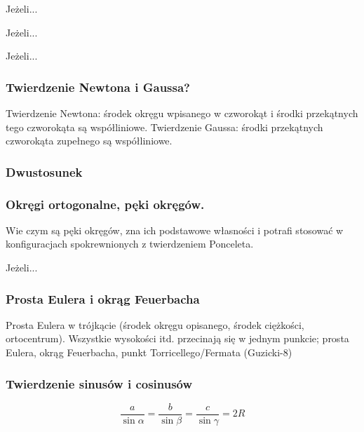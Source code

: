 \begin{proposition}
	Jeżeli...
\end{proposition}
\begin{theorem}
	Jeżeli...
\end{theorem}
\begin{definition}
	Jeżeli...
\end{definition}


\subsubsection{Twierdzenie Newtona i Gaussa?}
Twierdzenie Newtona: środek okręgu wpisanego w czworokąt i środki przekątnych tego czworokąta są współliniowe.
Twierdzenie Gaussa: środki przekątnych czworokąta zupełnego są współliniowe.

\subsubsection{Dwustosunek}

\subsubsection{Okręgi ortogonalne, pęki okręgów.}
Wie czym są pęki okręgów, zna ich podstawowe własności i potrafi stosować w konfiguracjach spokrewnionych z twierdzeniem Ponceleta.   

\begin{theorem}[Ponceleta]
	Jeżeli...
\end{theorem}


\subsubsection{Prosta Eulera i okrąg Feuerbacha}
Prosta Eulera w trójkącie (środek okręgu opisanego, środek ciężkości, ortocentrum).
Wszystkie wysokości itd. przecinają się w jednym punkcie; prosta Eulera, okrąg Feuerbacha, punkt Torricellego/Fermata (Guzicki-8)


\subsubsection{Twierdzenie sinusów i cosinusów}

$$\frac{a}{\sin \alpha} = \frac{b}{\sin \beta} = \frac{c}{\sin \gamma} = 2R$$

